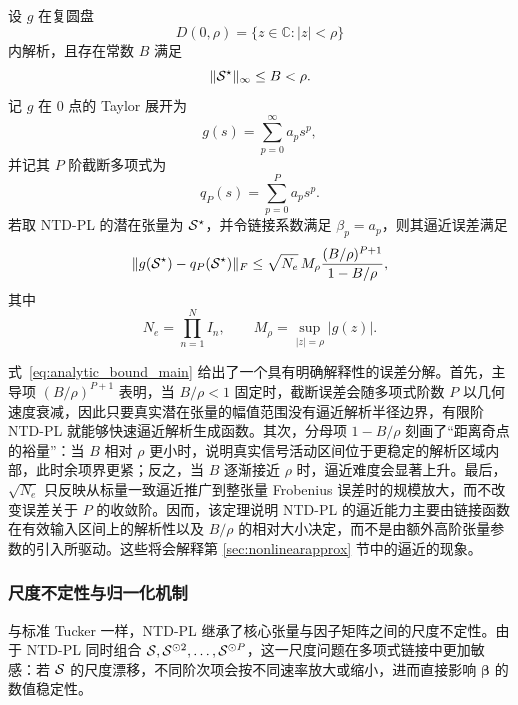 \begin{theorem}[解析函数下的显式截断误差界]
\label{thm:analytic_bound_main}
设 $g$ 在复圆盘
\begin{equation}
D(0,\rho)=\{z\in\mathbb C:|z|<\rho\}
\end{equation}
内解析，且存在常数 $B$ 满足
\begin{equation}
\|\mathcal{S}^\star\|_\infty \le B < \rho.
\end{equation}
记 $g$ 在 $0$ 点的 Taylor 展开为
\begin{equation}
g(s)=\sum_{p=0}^{\infty} a_p s^p,
\end{equation}
并记其 $P$ 阶截断多项式为
\begin{equation}
q_P(s)=\sum_{p=0}^{P} a_p s^p.
\end{equation}
若取 NTD-PL 的潜在张量为 $\mathcal{S}^\star$，并令链接系数满足 $\beta_p=a_p$，则其逼近误差满足
\begin{equation}
\|g(\mathcal{S}^\star)-q_P(\mathcal{S}^\star)\|_F
\le
\sqrt{N_e}\,M_\rho
\frac{(B/\rho)^{P+1}}{1-B/\rho},
\label{eq:analytic_bound_main}
\end{equation}
其中
\begin{equation}
N_e=\prod_{n=1}^N I_n,
\qquad
M_\rho=\sup_{|z|=\rho}|g(z)|.
\end{equation}
\end{theorem}

式~\eqref{eq:analytic_bound_main} 给出了一个具有明确解释性的误差分解。首先，主导项 $(B/\rho)^{P+1}$ 表明，当 $B/\rho<1$ 固定时，截断误差会随多项式阶数 $P$ 以几何速度衰减，因此只要真实潜在张量的幅值范围没有逼近解析半径边界，有限阶 NTD-PL 就能够快速逼近解析生成函数。其次，分母项 $1-B/\rho$ 刻画了“距离奇点的裕量”：当 $B$ 相对 $\rho$ 更小时，说明真实信号活动区间位于更稳定的解析区域内部，此时余项界更紧；反之，当 $B$ 逐渐接近 $\rho$ 时，逼近难度会显著上升。最后，$\sqrt{N_e}$ 只反映从标量一致逼近推广到整张量 Frobenius 误差时的规模放大，而不改变误差关于 $P$ 的收敛阶。因而，该定理说明 NTD-PL 的逼近能力主要由链接函数在有效输入区间上的解析性以及 $B/\rho$ 的相对大小决定，而不是由额外高阶张量参数的引入所驱动。这些将会解释第 \ref{sec:nonlinearapprox} 节中的逼近的现象。

\subsubsection{尺度不定性与归一化机制}

与标准 Tucker 一样，NTD-PL 继承了核心张量与因子矩阵之间的尺度不定性。由于 NTD-PL 同时组合 $\mathcal{S},\mathcal{S}^{\odot 2},\dots,\mathcal{S}^{\odot P}$，这一尺度问题在多项式链接中更加敏感：若 $\mathcal{S}$ 的尺度漂移，不同阶次项会按不同速率放大或缩小，进而直接影响 $\boldsymbol\beta$ 的数值稳定性。

